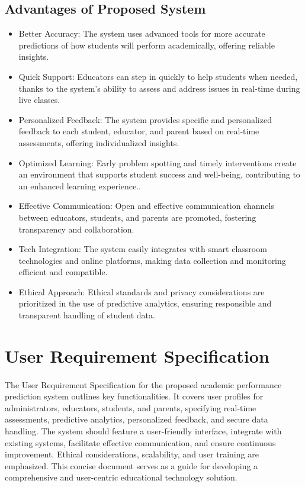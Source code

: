 \subsection{Advantages of Proposed System}
\begin{itemize}
\item Better Accuracy: The system uses advanced tools for more accurate predictions of how students will perform academically, offering reliable insights.
\item Quick Support: Educators can step in quickly to help students when needed, thanks to the system's ability to assess and address issues in real-time during live classes.
\item Personalized Feedback: The system provides specific and personalized feedback to each student, educator, and parent based on real-time assessments, offering individualized insights.
\item Optimized Learning: Early problem spotting and timely interventions create an environment that supports student success and well-being, contributing to an enhanced learning experience..
\item Effective Communication: Open and effective communication channels between educators, students, and parents are promoted, fostering transparency and collaboration.
\item Tech Integration: The system easily integrates with smart classroom technologies and online platforms, making data collection and monitoring efficient and compatible.
\item Ethical Approach: Ethical standards and privacy considerations are prioritized in the use of predictive analytics, ensuring responsible and transparent handling of student data.






\end{itemize}

\section{User Requirement Specification}
\paragraph{}
The User Requirement Specification for the proposed academic performance prediction system outlines key functionalities. It covers user profiles for administrators, educators, students, and parents, specifying real-time assessments, predictive analytics, personalized feedback, and secure data handling. The system should feature a user-friendly interface, integrate with existing systems, facilitate effective communication, and ensure continuous improvement. Ethical considerations, scalability, and user training are emphasized. This concise document serves as a guide for developing a comprehensive and user-centric educational technology solution.

